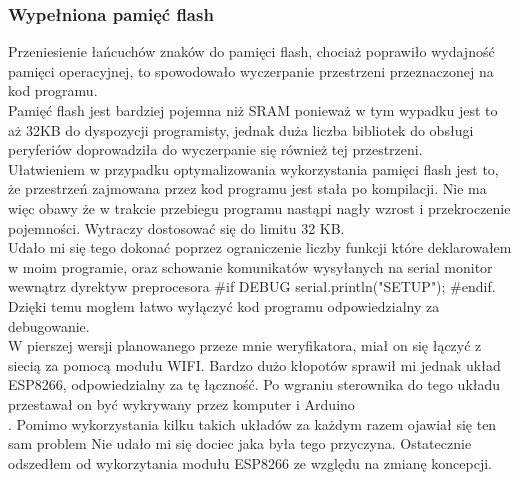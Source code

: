\documentclass[declaration,shortabstract, mgr]{iithesis}
\begin{document}
\subsubsection{Wypełniona pamięć flash}
\indent Przeniesienie łańcuchów znaków do pamięci flash, chociaż poprawiło wydajność pamięci operacyjnej, to spowodowało wyczerpanie przestrzeni przeznaczonej  na kod programu. \\
\indent Pamięć flash jest bardziej pojemna niż SRAM ponieważ w tym wypadku jest to aż 32KB do dyspozycji programisty, jednak duża liczba bibliotek do obsługi peryferiów doprowadziła do wyczerpanie się również tej przestrzeni. \\
\indent Ułatwieniem w przypadku optymalizowania wykorzystania pamięci flash jest to, że przestrzeń zajmowana przez kod programu jest stała po kompilacji. Nie ma więc obawy że w trakcie przebiegu programu nastąpi nagły wzrost i przekroczenie pojemności. Wytraczy dostosować się do limitu 32 KB. \\
\indent Udało mi się tego dokonać poprzez ograniczenie liczby funkcji które deklarowałem w moim programie, oraz schowanie komunikatów wysyłanych na serial monitor wewnątrz dyrektyw preprocesora \#if DEBUG serial.println("SETUP"); \#endif. Dzięki temu mogłem łatwo wyłączyć kod programu odpowiedzialny za debugowanie.\\
\indent W pierszej wersji planowanego przeze mnie weryfikatora, miał on się łączyć z siecią za pomocą modułu WIFI. Bardzo dużo kłopotów sprawił mi jednak układ ESP8266, odpowiedzialny za tę łączność. Po wgraniu sterownika do tego układu przestawał on być wykrywany przez komputer i Arduino\\. \indent Pomimo wykorzystania kilku takich układów za każdym razem ojawiał się ten sam problem  Nie udało mi się dociec jaka była tego przyczyna. Ostatecznie odszedłem od wykorzytania modułu ESP8266 ze względu na zmianę koncepcji.
\end{document}
